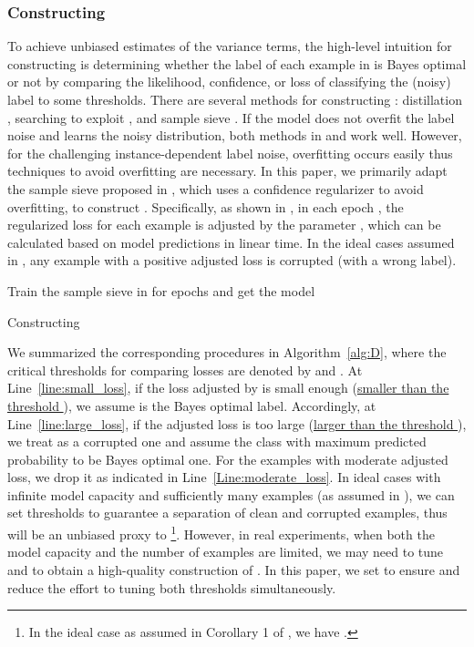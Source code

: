 \documentclass[final]{cvpr}
\newcommand{\rev}[1]{{\color{blue}#1}}
\newcommand{\rev}[1]{#1}
\begin{document}
\subsubsection{Constructing }\label{sec:alg}

To achieve unbiased estimates of the variance terms, the high-level intuition for constructing  is determining whether the label of each example in  is Bayes optimal or not by comparing the likelihood, confidence, or loss of classifying the (noisy) label to some thresholds.
There are several methods for constructing : distillation \cite{cheng2017learningdistill}, searching to exploit \cite{yao2020searching}, and sample sieve \cite{sieve2020}.
If the model does not overfit the label noise and learns the noisy distribution, both methods in \cite{cheng2017learningdistill} and \cite{yao2020searching} work well. However, for the challenging instance-dependent label noise, overfitting occurs easily thus techniques to avoid overfitting are necessary. In this paper, we primarily adapt the sample sieve proposed in \cite{sieve2020}, which uses a confidence regularizer to avoid overfitting, to construct . 
{Specifically, as shown in \cite{sieve2020}, in each epoch , the regularized loss for each example is adjusted by the parameter , which \rev{can be calculated based on model predictions in linear time}. In the ideal cases assumed in \cite{sieve2020}, any example with a positive adjusted loss is corrupted (with a wrong label).}

\begin{algorithm}[t]
\LinesNumbered
\SetAlgoLined
{}
Train the sample sieve in \cite{sieve2020} for  epochs and get the model \;
 \KwOut{}
 \caption{Constructing }
 \label{alg:D}
\end{algorithm}
We summarized the corresponding procedures in Algorithm~\ref{alg:D}, where the critical thresholds for comparing losses are denoted by  and .
At Line~\ref{line:small_loss}, if the loss adjusted by  is small enough (\underline{smaller than the threshold }), we assume  is the Bayes optimal label.
Accordingly, at Line~\ref{line:large_loss}, if the adjusted loss is too large (\underline{larger than the threshold }), we treat  as a corrupted one and assume the class with maximum predicted probability to be Bayes optimal one.
For the examples with moderate adjusted loss, we drop it as indicated in Line~\ref{Line:moderate_loss}.
In ideal cases with infinite model capacity and sufficiently many examples (as assumed in \cite{sieve2020}), we can set thresholds  to guarantee a separation of clean and corrupted examples, thus  will be an unbiased proxy to  \footnote{In the ideal case as assumed in Corollary 1 of \cite{sieve2020}, we have .}.
However, in real experiments, when both the model capacity and the number of examples are limited, we may need to tune  and  to obtain a high-quality construction of .
In this paper, we set  to ensure  and reduce the effort to tuning both thresholds simultaneously.
\end{document}
